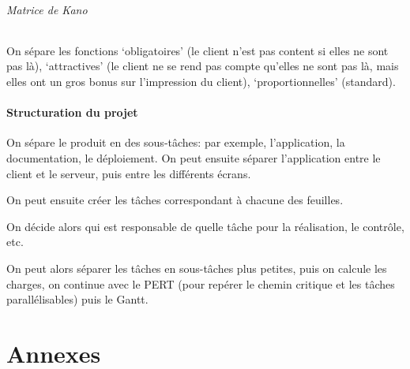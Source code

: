 \documentclass[10pt,a4paper,french]{article}
\begin{document}
\paragraph{Matrice de Kano}
On sépare les fonctions `obligatoires' (le client n'est pas content si elles ne sont pas là), `attractives' (le client ne se rend pas compte qu'elles ne sont pas là, mais elles ont un gros bonus sur l'impression du client), `proportionnelles' (standard).

\subsection{Structuration du projet}

On sépare le produit en des sous-tâches: par exemple, l'application, la documentation, le déploiement. On peut ensuite séparer l'application entre le client et le serveur, puis entre les différents écrans.

On peut ensuite créer les tâches correspondant à chacune des feuilles.

On décide alors qui est responsable de quelle tâche pour la réalisation, le contrôle, etc.

On peut alors séparer les tâches en sous-tâches plus petites, puis on calcule les charges, on continue avec le PERT (pour repérer le chemin critique et les tâches parallélisables) puis le Gantt.

\appendix %
\part{Annexes}
\printglossaries
\printindex
\end{document}
